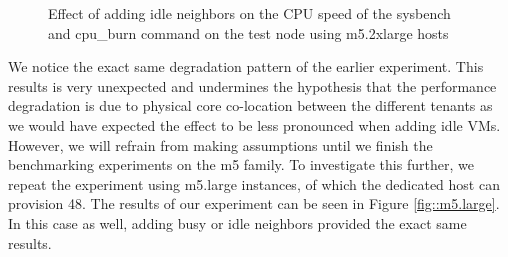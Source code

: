 \begin{figure}[H]
\centering
{}
\caption{Effect of adding idle neighbors on the CPU speed of the sysbench and cpu\_burn command on the test node using m5.2xlarge hosts} 
\label{fig::m5.2xlarge_idle}
\end{figure}
\noindent
We notice the exact same degradation pattern of the earlier experiment. This results is very unexpected
and undermines the hypothesis that the performance degradation is due to physical core co-location between the different 
tenants as we would have expected the effect to be less pronounced when adding idle VMs. However, we will 
refrain from making assumptions until we finish the benchmarking experiments on the m5 family. 
To investigate this further, we repeat the experiment using m5.large instances, of which the dedicated host can 
provision 48. The results of our experiment can be seen in Figure \ref{fig::m5.large}. In this 
case as well, adding busy or idle neighbors provided the exact same results.  

